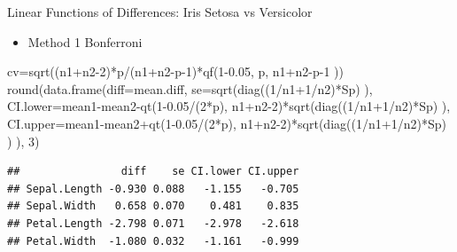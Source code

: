 \documentclass[
  ignorenonframetext,
]{beamer}
\newenvironment{Shaded}{\begin{snugshade}}{\end{snugshade}}
\newcommand{\AttributeTok}[1]{\textcolor[rgb]{0.77,0.63,0.00}{#1}}
\newcommand{\DecValTok}[1]{\textcolor[rgb]{0.00,0.00,0.81}{#1}}
\newcommand{\FloatTok}[1]{\textcolor[rgb]{0.00,0.00,0.81}{#1}}
\newcommand{\FunctionTok}[1]{\textcolor[rgb]{0.00,0.00,0.00}{#1}}
\newcommand{\NormalTok}[1]{#1}
\newcommand{\OtherTok}[1]{\textcolor[rgb]{0.56,0.35,0.01}{#1}}
\newcommand{\SpecialCharTok}[1]{\textcolor[rgb]{0.00,0.00,0.00}{#1}}
\providecommand{\tightlist}{%
  \setlength{\itemsep}{0pt}\setlength{\parskip}{0pt}}
\begin{document}
\begin{frame}[fragile]{Linear Functions of Differences: Iris Setosa vs
Versicolor}
\protect\hypertarget{linear-functions-of-differences-iris-setosa-vs-versicolor-3}{}
\begin{itemize}
\tightlist
\item
  Method 1 Bonferroni
\end{itemize}

\tiny

\begin{Shaded}
\begin{Highlighting}[]
\NormalTok{cv}\OtherTok{=}\FunctionTok{sqrt}\NormalTok{((n1}\SpecialCharTok{+}\NormalTok{n2}\DecValTok{{-}2}\NormalTok{)}\SpecialCharTok{*}\NormalTok{p}\SpecialCharTok{/}\NormalTok{(n1}\SpecialCharTok{+}\NormalTok{n2}\SpecialCharTok{{-}}\NormalTok{p}\DecValTok{{-}1}\NormalTok{)}\SpecialCharTok{*}\FunctionTok{qf}\NormalTok{(}\DecValTok{1}\FloatTok{{-}0.05}\NormalTok{, p, n1}\SpecialCharTok{+}\NormalTok{n2}\SpecialCharTok{{-}}\NormalTok{p}\DecValTok{{-}1}\NormalTok{ ))}
\FunctionTok{round}\NormalTok{(}\FunctionTok{data.frame}\NormalTok{(}\AttributeTok{diff=}\NormalTok{mean.diff, }\AttributeTok{se=}\FunctionTok{sqrt}\NormalTok{(}\FunctionTok{diag}\NormalTok{((}\DecValTok{1}\SpecialCharTok{/}\NormalTok{n1}\SpecialCharTok{+}\DecValTok{1}\SpecialCharTok{/}\NormalTok{n2)}\SpecialCharTok{*}\NormalTok{Sp) ),}
\AttributeTok{CI.lower=}\NormalTok{mean1}\SpecialCharTok{{-}}\NormalTok{mean2}\SpecialCharTok{{-}}\FunctionTok{qt}\NormalTok{(}\DecValTok{1}\FloatTok{{-}0.05}\SpecialCharTok{/}\NormalTok{(}\DecValTok{2}\SpecialCharTok{*}\NormalTok{p), n1}\SpecialCharTok{+}\NormalTok{n2}\DecValTok{{-}2}\NormalTok{)}\SpecialCharTok{*}\FunctionTok{sqrt}\NormalTok{(}\FunctionTok{diag}\NormalTok{((}\DecValTok{1}\SpecialCharTok{/}\NormalTok{n1}\SpecialCharTok{+}\DecValTok{1}\SpecialCharTok{/}\NormalTok{n2)}\SpecialCharTok{*}\NormalTok{Sp) ),}
\AttributeTok{CI.upper=}\NormalTok{mean1}\SpecialCharTok{{-}}\NormalTok{mean2}\SpecialCharTok{+}\FunctionTok{qt}\NormalTok{(}\DecValTok{1}\FloatTok{{-}0.05}\SpecialCharTok{/}\NormalTok{(}\DecValTok{2}\SpecialCharTok{*}\NormalTok{p), n1}\SpecialCharTok{+}\NormalTok{n2}\DecValTok{{-}2}\NormalTok{)}\SpecialCharTok{*}\FunctionTok{sqrt}\NormalTok{(}\FunctionTok{diag}\NormalTok{((}\DecValTok{1}\SpecialCharTok{/}\NormalTok{n1}\SpecialCharTok{+}\DecValTok{1}\SpecialCharTok{/}\NormalTok{n2)}\SpecialCharTok{*}\NormalTok{Sp) ) ), }\DecValTok{3}\NormalTok{)}
\end{Highlighting}
\end{Shaded}

\begin{verbatim}
##                diff    se CI.lower CI.upper
## Sepal.Length -0.930 0.088   -1.155   -0.705
## Sepal.Width   0.658 0.070    0.481    0.835
## Petal.Length -2.798 0.071   -2.978   -2.618
## Petal.Width  -1.080 0.032   -1.161   -0.999
\end{verbatim}

\normalsize
\end{frame}
\end{document}
